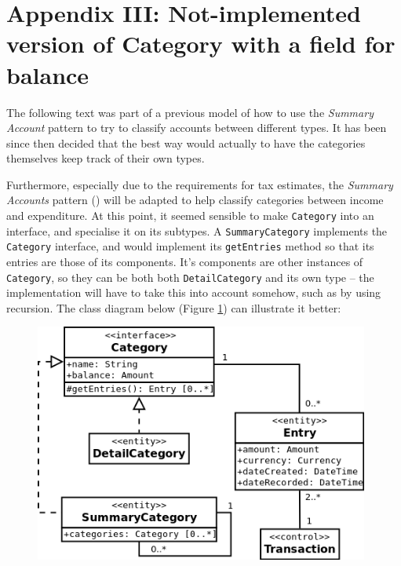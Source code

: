 \section{Appendix III: Not-implemented version of Category with a field for balance} \label{appendix3}

The following text was part of a previous model of how to use the \emph{Summary
Account} pattern to try to classify accounts between different types. It has
been since then decided that the best way would actually to have the categories
themselves keep track of their own types.

Furthermore, especially due to the requirements for tax estimates, the
\emph{Summary Accounts} pattern (\cite[][Section~6.3]{fowler1997analysis}) will
be adapted to help classify categories between income and expenditure. At this
point, it seemed sensible to make \texttt{Category} into an interface, and
specialise it on its subtypes. A \texttt{SummaryCategory} implements the
\texttt{Category} interface, and would implement its \texttt{getEntries} method
so that its entries are those of its components. It's components are other
instances of \texttt{Category}, so they can be both both
\texttt{DetailCategory} and its own type -- the implementation will have to
take this into account somehow, such as by using recursion. The class diagram
below (Figure \ref{fig:ClassDiagram.SummaryCategory}) can illustrate it better:

\begin{figure}[ht!]
  \begin{center}
    \includegraphics[width=11cm]{./contents/img/Class_Diagram_-_Summary_Category.png}
  \end{center}
  \caption{}
  \label{fig:ClassDiagram.SummaryCategory}
\end{figure}
\FloatBarrier

